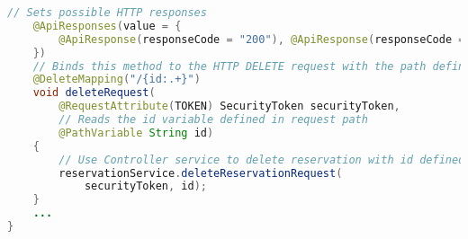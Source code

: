 \begin{lstlisting}[language=java, caption=ReservationRequestController.java, label=lst:controller]
    // Sets possible HTTP responses
    @ApiResponses(value = {
        @ApiResponse(responseCode = "200"), @ApiResponse(responseCode = "404", description = "Reservation request not found.", content = @Content),
    })
    // Binds this method to the HTTP DELETE request with the path defined in @RequestMapping concatenated with "/{id:.+}". The ':' marks the start of a regex used for the id variable (useful to accept only numbers, for example). The regex ".+" is used because shongo-id can include URL key characters like ':' or '-'.
    @DeleteMapping("/{id:.+}")
    void deleteRequest(
        @RequestAttribute(TOKEN) SecurityToken securityToken,
        // Reads the id variable defined in request path
        @PathVariable String id)
    {
        // Use Controller service to delete reservation with id defined in path
        reservationService.deleteReservationRequest(
            securityToken, id);
    }
    ...
}
\end{lstlisting}